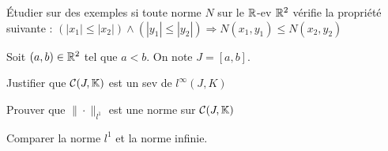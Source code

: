 \documentclass{report}
\begin{document}
\begin{exo}
    Étudier sur des exemples si toute norme \(N\) sur le \(\mathbb{R}\)-ev \(\mathbb{R}^2\)
    vérifie la propriété suivante : \(\left(|x_1|\leq|x_2|\right)\land
    \left(|y_1|\leq|y_2|\right)\Rightarrow N\left(x_1,y_1\right)\leq N\left(x_2,y_2\right)\)
\end{exo}

\begin{exo}
    Soit \(\left(a,b\right)\in\mathbb{R}^2\) tel que \(a<b\). On note \(J=[a,b]\).
    \begin{q}{1}
        Justifier que \(\mathcal{C}(J,\mathbb{K})\) est un sev de \(l^\infty(J,K)\)
    \end{q}
    \begin{q}{2}
        Prouver que \(\|\cdot\|_{l^1}\) est une norme sur \(\mathcal{C}(J,\mathbb{K})\)
    \end{q}
    \begin{q}{3}
        Comparer la norme \(l^1\) et la norme infinie.
    \end{q}
\end{exo}
\end{document}
